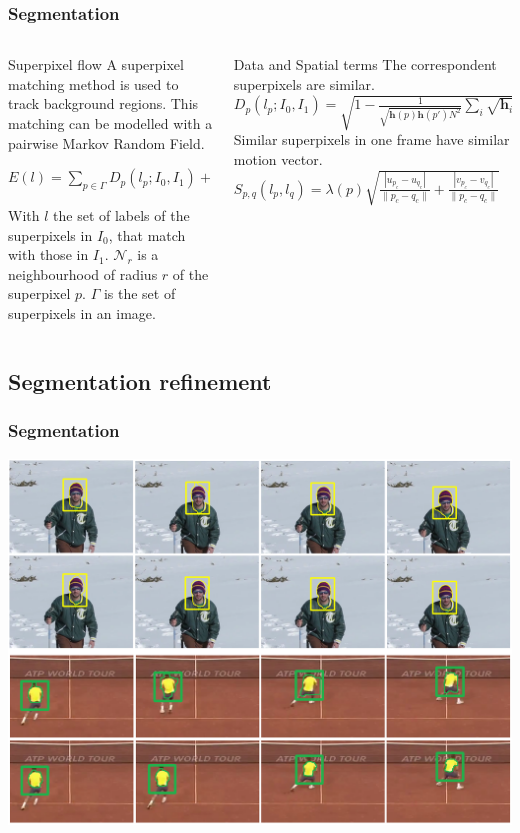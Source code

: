 \documentclass{beamer}
\begin{document}
\begin{frame}[shrink=15]
	\frametitle{Segmentation}
  \begin{columns}[T]
    \begin{column}{.5\textwidth}
		\begin{block}{Superpixel flow} 
A superpixel matching method is used to track background regions. 
This matching can be modelled with 
a pairwise Markov Random Field.

$ E(l) = \displaystyle \sum_{p \in \Gamma} D_p(l_p;I_0,I_1)+
\sum_{(p,q): q \in \mathcal{N}_r} S_{p,q}(l_p,l_q) $  

With $l$ the set of labels of the superpixels in $I_0$,
that match with those in $I_1$. $\mathcal{N}_r$ is a neighbourhood of radius $r$ of the superpixel $p$. $\Gamma$ is the set of superpixels in an image.
 
	\end{block}
    \end{column}	
    \begin{column}{.5\textwidth}
    		\begin{block}{Data and Spatial terms} 
    		The correspondent superpixels are similar.
    $ D_p(l_p;I_0,I_1) = \sqrt{ 1 - \frac{1}{\sqrt{\bar{ \boldsymbol{h} }(p) \bar{ \boldsymbol{h} }(p')N^2} } \sum_{i}\sqrt{ \boldsymbol{h}_{i}(p) \boldsymbol{h}_{i}(p')} }. $
Similar superpixels in one frame have similar motion vector.
$ S_{p,q}(l_p, l_q) = \lambda(p)
  \sqrt{\frac{|u_{p_c}-u_{q_c}|}{\|p_c-q_c\|}+ \frac{|v_{p_c}-v_{q_c}|}{\|p_c-q_c\|}} $    
    		\end{block}
    \end{column}	
  \end{columns}  
\end{frame}

\subsection{Segmentation refinement}

\begin{frame}
	\frametitle{Segmentation}
\includegraphics[height=0.85\textheight]{../images/compareSegm2.png}
\end{frame}
\end{document}
